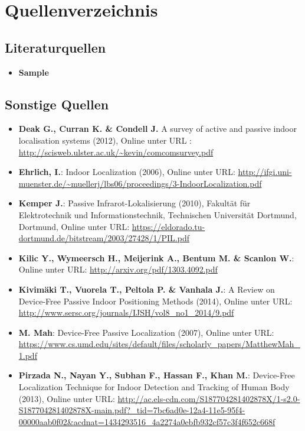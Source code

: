\newpage

\section{Quellenverzeichnis}
\subsection*{Literaturquellen}
\begin{itemize}[leftmargin=*]
\item[] \textbf{Sample}
\end{itemize}
\subsection*{Sonstige Quellen}
\begin{itemize}[leftmargin=*]
\item[] \textbf{Deak G., Curran K. \& Condell J.} A survey of active and passive indoor localisation systems (2012), Online unter URL : \url{http://scisweb.ulster.ac.uk/~kevin/comcomsurvey.pdf}
\item[] \textbf{Ehrlich, I.}: Indoor Localization (2006), Online unter URL: \url{http://ifgi.uni-muenster.de/~muellerj/lbs06/proceedings/3-IndoorLocalization.pdf}
\item[] \textbf{Kemper J.}: Passive Infrarot-Lokalisierung (2010), Fakultät für Elektrotechnik und Informationstechnik, Technischen Universität Dortmund, Dortmund, Online unter URL: \url{https://eldorado.tu-dortmund.de/bitstream/2003/27428/1/PIL.pdf}
\item[] \textbf{Kilic Y., Wymeersch H., Meijerink A., Bentum M. \& Scanlon W.}: Online unter URL: \url{http://arxiv.org/pdf/1303.4092.pdf}
\item[] \textbf{Kivimäki T., Vuorela T., Peltola P. \& Vanhala J.}: A Review on Device-Free Passive Indoor Positioning Methods (2014), Online unter URL: \url{http://www.sersc.org/journals/IJSH/vol8_no1_2014/9.pdf}
\item[] \textbf{M. Mah}: Device-Free Passive Localization (2007), Online unter URL: \url{https://www.cs.umd.edu/sites/default/files/scholarly_papers/MatthewMah_1.pdf}
\item[] \textbf{Pirzada N., Nayan Y., Subhan F., Hassan F., Khan M.}: Device-Free Localization Technique for Indoor Detection and Tracking of Human Body (2013), Online unter URL: \url{http://ac.els-cdn.com/S187704281402878X/1-s2.0-S187704281402878X-main.pdf?_tid=7bc6ad0e-12a4-11e5-95f4-00000aab0f02&acdnat=1434293516_4a2274a0ebfb932cf57c3f4f652c668f}

\end{itemize}
